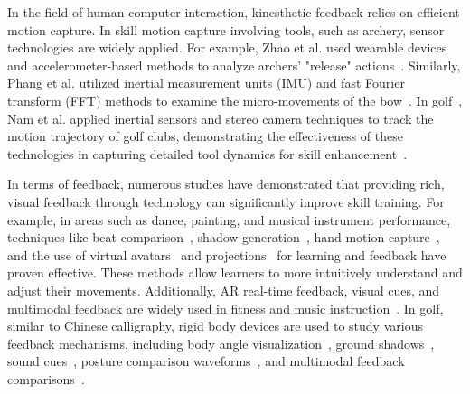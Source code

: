 In the field of human-computer interaction, kinesthetic feedback relies on efficient motion capture. In skill motion capture involving tools, such as archery, sensor technologies are widely applied. For example, Zhao et al. used wearable devices and accelerometer-based methods to analyze archers' "release" actions~\cite{zhao2016archery}. Similarly, Phang et al. utilized inertial measurement units (IMU) and fast Fourier transform (FFT) methods to examine the micro-movements of the bow~\cite{phang2024archery}. In golf~\cite{king2008wireless, fitzpatrick2010validation}, Nam et al. applied inertial sensors and stereo camera techniques to track the motion trajectory of golf clubs, demonstrating the effectiveness of these technologies in capturing detailed tool dynamics for skill enhancement~\cite{nam2013golf}.

In terms of feedback, numerous studies have demonstrated that providing rich, visual feedback through technology can significantly improve skill training. For example, in areas such as dance, painting, and musical instrument performance, techniques like beat comparison~\cite{10.1145/3274247.3274514}, shadow generation~\cite{10.1145/2010324.1964922}, hand motion capture~\cite{10.1145/3544549.3585838}, and the use of virtual avatars~\cite{10.1007/978-3-030-36126-6_7} and projections~\cite{5557840} for learning and feedback have proven effective. These methods allow learners to more intuitively understand and adjust their movements. Additionally, AR real-time feedback, visual cues, and multimodal feedback are widely used in fitness and music instruction~\cite{10.1145/3411764.3445649, 10.1145/3491102.3517735, 10.1145/3411764.3445595}. In golf, similar to Chinese calligraphy, rigid body devices are used to study various feedback mechanisms, including body angle visualization~\cite{10.1145/1878083.1878098}, ground shadows~\cite{10.1145/3305367.3327993}, sound cues~\cite{10.1145/3305367.3327993, 10.1145/3281505.3281604}, posture comparison waveforms~\cite{10.1145/3476124.3488645}, and multimodal feedback comparisons~\cite{10.1145/3427332}.

